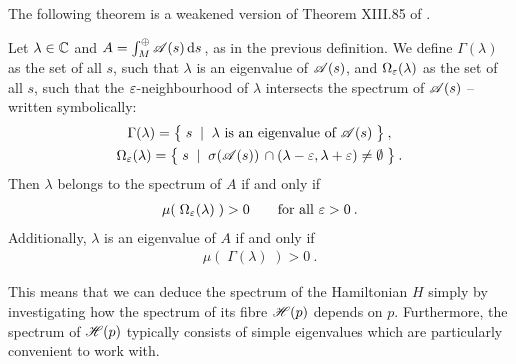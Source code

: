 The following theorem is a weakened version of Theorem XIII.85 of \citet{ReedSimon4}.

\begin{thm}
    \label{thm-direct-integral-spectrum}
    Let $\lambda \in \mathbb{C}$ and $A = \int^\oplus_M \mathscr{A}(s) \, \mathrm{d}s \,$, as in the previous definition. We define $\Gamma(\lambda)$ as the set of all $s$, such that $\lambda$ is an eigenvalue of $\mathscr{A}(s)$, and $\Omega_\varepsilon(\lambda)$ as the set of all $s$, such that the $\varepsilon$-neighbourhood of $\lambda$ intersects the spectrum of $\mathscr{A}(s)$ – written symbolically:
    \begin{gather*}
        \Gamma(\lambda)
        = \big\{\; s \;\;|\;\; \lambda \text{ is an eigenvalue of } \mathscr{A}(s) \;\big\} \: ,
        \\
        \Omega_\varepsilon(\lambda)
        = \big\{\; s \;\;|\;\; \sigma(\mathscr{A}(s)) \, \cap (\lambda - \varepsilon, \lambda + \varepsilon) \neq \emptyset \;\big\} \: .
    \end{gather*}
    Then $\lambda$ belongs to the spectrum of $A$ if and only if
    \begin{gather*}
        \mu(\; \Omega_\varepsilon(\lambda) \;) > 0
        \qquad \text{for all } \varepsilon > 0 \: .
    \end{gather*}
    Additionally, $\lambda$ is an eigenvalue of $A$ if and only if
    \begin{gather*}
        \mu(\; \Gamma(\lambda) \;) > 0 \: .
    \end{gather*}
\end{thm}

This means that we can deduce the spectrum of the Hamiltonian $H$ simply by investigating how the spectrum of its fibre $\mathscr{H}(p)$ depends on $p$. Furthermore, the spectrum of $\mathscr{H}(p)$ typically consists of simple eigenvalues which are particularly convenient to work with.

